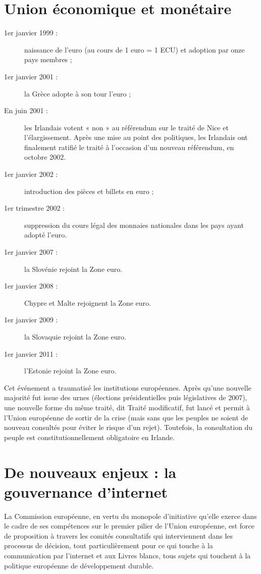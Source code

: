 \documentclass{report}%
\begin{document}
\section{Union économique et monétaire}
	\begin{description}
		\item  [1er janvier 1999 :] naissance de l'euro (au cours de 1 euro = 1 ECU) et adoption par onze pays membres ;
		\item [1er janvier 2001 :] la Grèce adopte à son tour l'euro ;
		\item [En juin 2001 :] les Irlandais votent « non » au référendum sur le traité de Nice et l'élargissement. Après une mise au point des politiques, les Irlandais ont finalement ratifié le traité à l'occasion d'un nouveau référendum, en octobre 2002.
		\item [1er janvier 2002 :] introduction des pièces et billets en euro ;
		\item [1er trimestre 2002 :] suppression du cours légal des monnaies nationales dans les pays ayant adopté l'euro.
		\item [1er janvier 2007 :] la Slovénie rejoint la Zone euro.
		\item [1er janvier 2008 :] Chypre et Malte rejoignent la Zone euro.
		\item [1er janvier 2009 :] la Slovaquie rejoint la Zone euro.
		\item [1er janvier 2011 :] l'Estonie rejoint la Zone euro.
	\end{description}
Cet événement a traumatisé les institutions européennes. Après qu'une nouvelle majorité fut issue des urnes (élections présidentielles puis législatives de 2007), une nouvelle forme du même traité, dit Traité modificatif, fut lancé et permit à l'Union européenne de sortir de la crise (mais sans que les peuples ne soient de nouveau consultés pour éviter le risque d'un rejet). Toutefois, la consultation du peuple est constitutionnellement obligatoire en Irlande.
\section{De nouveaux enjeux : la gouvernance d'internet}
La Commission européenne, en vertu du monopole d'initiative qu'elle exerce dans le cadre de ses compétences sur le premier pilier de l'Union européenne, est force de proposition à travers les comités consultatifs qui interviennent dans les processus de décision, tout particulièrement pour ce qui touche à la communication par l'internet et aux Livres blancs, tous sujets qui touchent à la politique européenne de développement durable.
\end{document}
